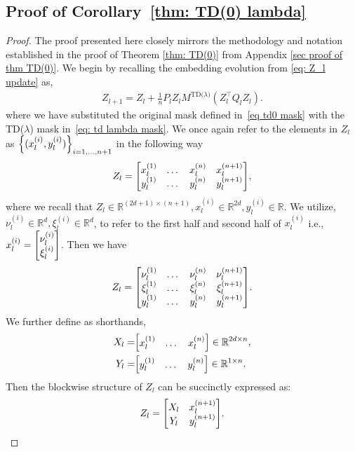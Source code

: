\documentclass{article}
\newcommand{\R}{\mathbb{R}}
\newcommand{\tdlambda}{\text{TD($\lambda$)}}
\begin{document}
\subsection{Proof of Corollary~\ref{thm: TD(0) lambda}}
\label{sec proof thm: TD(0) lambda}
\begin{proof}
    The proof presented here closely mirrors the methodology and notation established in the proof of Theorem \ref{thm: TD(0)} from Appendix \ref{sec proof of thm TD(0)}. We begin by recalling the embedding evolution from \eqref{eq: Z_l update} as,
    \begin{align}
        Z_{l+1} = Z_l + \frac{1}{n} P_l Z_l M^\tdlambda(Z_l^\top Q_l Z_l).
    \end{align}
    where we have substituted the original mask defined in~\eqref{eq td0 mask} with the TD($\lambda$) mask in~\eqref{eq: td lambda mask}.
    We once again refer to the elements in $Z_l$ as $\qty{(x^{(i)}_l, y^{(i)}_l)}_{i=1,\dots, n+1}$ in the following way
    \begin{align}
        Z_l = \mqty[x_l^{(1)} & \dots & x_l^{(n)} & x_l^{(n+1)} \\ y_l^{(1)} & \dots & y_l^{(n)} & y_l^{(n+1)}],
    \end{align}
    where we recall that $Z_l \in \R^{(2d + 1) \times (n+1)}, x_l^{(i)} \in \R^{2d}, y^{(i)}_l \in \R$.
    We utilize, $\nu^{(i)}_l \in \R^d, \xi_l^{(i)} \in \R^d$, to refer to the first half and second half of $x_l^{(i)}$ i.e., $x_l^{(i)} = \mqty[\nu_l^{(i)} \\ \xi_l^{(i)}]$.
    Then we have
    \begin{align}
        Z_l = \mqty[\nu_l^{(1)} & \dots & \nu_l^{(n)} & \nu_l^{(n+1)} \\
        \xi_l^{(1)} & \dots & \xi_l^{(n)} & \xi_l^{(n+1)} \\
         y_l^{(1)} & \dots & y_l^{(n)} & y_l^{(n+1)}].
    \end{align}
    We further define as shorthands,
    \begin{align}
        X_l =& \mqty[x_l^{(1)} & \dots & x_l^{(n)}] \in \R^{2d \times n}, \\
        Y_l =&  \mqty[y_l^{(1)} & \dots & y_l^{(n)}] \in \R^{1 \times n}.
    \end{align}
    Then the blockwise structure of $Z_l$ can be succinctly expressed as:
    \begin{align}
        Z_l = \mqty[X_l & x_l^{(n+1)} \\ Y_l & y_l^{(n+1)}]. \label{eq: z_l blockwise X Y lambda}

\end{align}
\end{proof}
\end{document}
